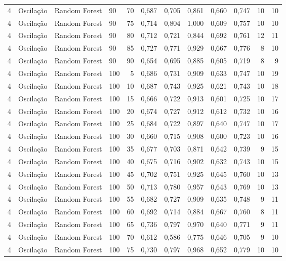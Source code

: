 \begin{longtable}{ccclrrrrrrrr}
4 & Oscilação & Random Forest & 90 & 70 & 0,687 & 0,705 & 0,861 & 0,660 & 0,747 & 10 & 10 \\
4 & Oscilação & Random Forest & 90 & 75 & 0,714 & 0,804 & 1,000 & 0,609 & 0,757 & 10 & 10 \\
4 & Oscilação & Random Forest & 90 & 80 & 0,712 & 0,721 & 0,844 & 0,692 & 0,761 & 12 & 11 \\
4 & Oscilação & Random Forest & 90 & 85 & 0,727 & 0,771 & 0,929 & 0,667 & 0,776 & 8 & 10 \\
4 & Oscilação & Random Forest & 90 & 90 & 0,654 & 0,695 & 0,885 & 0,605 & 0,719 & 8 & 9 \\
4 & Oscilação & Random Forest & 100 & 5 & 0,686 & 0,731 & 0,909 & 0,633 & 0,747 & 10 & 19 \\
4 & Oscilação & Random Forest & 100 & 10 & 0,687 & 0,743 & 0,925 & 0,621 & 0,743 & 10 & 18 \\
4 & Oscilação & Random Forest & 100 & 15 & 0,666 & 0,722 & 0,913 & 0,601 & 0,725 & 10 & 17 \\
4 & Oscilação & Random Forest & 100 & 20 & 0,674 & 0,727 & 0,912 & 0,612 & 0,732 & 10 & 16 \\
4 & Oscilação & Random Forest & 100 & 25 & 0,684 & 0,722 & 0,897 & 0,640 & 0,747 & 10 & 17 \\
4 & Oscilação & Random Forest & 100 & 30 & 0,660 & 0,715 & 0,908 & 0,600 & 0,723 & 10 & 16 \\
4 & Oscilação & Random Forest & 100 & 35 & 0,677 & 0,703 & 0,871 & 0,642 & 0,739 & 9 & 15 \\
4 & Oscilação & Random Forest & 100 & 40 & 0,675 & 0,716 & 0,902 & 0,632 & 0,743 & 10 & 15 \\
4 & Oscilação & Random Forest & 100 & 45 & 0,702 & 0,751 & 0,925 & 0,645 & 0,760 & 10 & 13 \\
4 & Oscilação & Random Forest & 100 & 50 & 0,713 & 0,780 & 0,957 & 0,643 & 0,769 & 10 & 13 \\
4 & Oscilação & Random Forest & 100 & 55 & 0,682 & 0,727 & 0,909 & 0,635 & 0,748 & 9 & 11 \\
4 & Oscilação & Random Forest & 100 & 60 & 0,692 & 0,714 & 0,884 & 0,667 & 0,760 & 8 & 11 \\
4 & Oscilação & Random Forest & 100 & 65 & 0,736 & 0,797 & 0,970 & 0,640 & 0,771 & 9 & 11 \\
4 & Oscilação & Random Forest & 100 & 70 & 0,612 & 0,586 & 0,775 & 0,646 & 0,705 & 9 & 10 \\
4 & Oscilação & Random Forest & 100 & 75 & 0,730 & 0,797 & 0,968 & 0,652 & 0,779 & 10 & 10 \\

\end{longtable}

